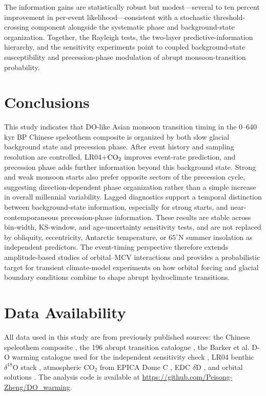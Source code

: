 \documentclass[11pt]{article}
\begin{document}
The information gains are statistically robust but modest—several to ten percent improvement in per-event likelihood—consistent with a stochastic threshold-crossing component alongside the systematic phase and background-state organization. Together, the Rayleigh tests, the two-layer predictive-information hierarchy, and the sensitivity experiments point to coupled background-state susceptibility and precession-phase modulation of abrupt monsoon-transition probability.

\section*{Conclusions}

This study indicates that DO-like Asian monsoon transition timing in the 0--640 kyr BP Chinese speleothem composite is organized by both slow glacial background state and precession phase. After event history and sampling resolution are controlled, LR04+\(\ce{CO2}\) improves event-rate prediction, and precession phase adds further information beyond this background state. Strong and weak monsoon starts also prefer opposite sectors of the precession cycle, suggesting direction-dependent phase organization rather than a simple increase in overall millennial variability. Lagged diagnostics support a temporal distinction between background-state information, especially for strong starts, and near-contemporaneous precession-phase information. These results are stable across bin-width, KS-window, and age-uncertainty sensitivity tests, and are not replaced by obliquity, eccentricity, Antarctic temperature, or \(65^\circ\)N summer insolation as independent predictors. The event-timing perspective therefore extends amplitude-based studies of orbital--MCV interactions and provides a probabilistic target for transient climate-model experiments on how orbital forcing and glacial boundary conditions combine to shape abrupt hydroclimate transitions.


\section*{Data Availability}

All data used in this study are from previously published sources: the Chinese speleothem composite \citep{cheng2016asian}, the 196 abrupt transition catalogue \citep{rousseau2023reliable}, the Barker et al. D-O warming catalogue used for the independent sensitivity check \citep{barker2011800}, LR04 benthic $\delta^{18}$O stack \citep{lisiecki2005pliocene}, atmospheric CO$_2$ from EPICA Dome C \citep{bereiter2015revision}, EDC \(\delta\)D \citep{jouzel2007orbital}, and orbital solutions \citep{laskar2004long}. The analysis code is available at \url{https://github.com/Peisong-Zheng/DO_warming}.
\end{document}
